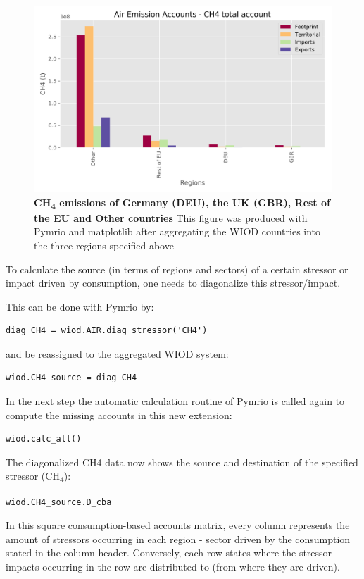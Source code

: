 \documentclass{jors}
\begin{document}
  \begin{figure}[h!]
      \includegraphics[width=.9\textwidth]{./fig/airch4.png}
      \caption{\textbf{CH\textsubscript{4} emissions of Germany (DEU), the UK (GBR), Rest of the EU and Other countries}
      This figure was produced with Pymrio and matplotlib after aggregating the WIOD countries into the three regions specified above}
      \end{figure}



To calculate the source (in terms of regions and sectors) of a certain stressor or impact driven by consumption, one needs to diagonalize this stressor/impact. 

This can be done with Pymrio by:
\begin{lstlisting}
diag_CH4 = wiod.AIR.diag_stressor('CH4')
\end{lstlisting}

and be reassigned to the aggregated WIOD system:
\begin{lstlisting}
wiod.CH4_source = diag_CH4
\end{lstlisting}

In the next step the automatic calculation routine of Pymrio is called again to compute the missing accounts in this new extension:

\begin{lstlisting}
wiod.calc_all()
\end{lstlisting}

The diagonalized CH4 data now shows the source and destination of the specified stressor (CH\textsubscript{4}):
\begin{lstlisting}
wiod.CH4_source.D_cba
\end{lstlisting}

In this square consumption-based accounts matrix, every column represents the amount of stressors occurring in each region - sector driven by the consumption stated in the column header. Conversely, each row states where the stressor impacts occurring in the row are distributed to (from where they are driven).
\end{document}
